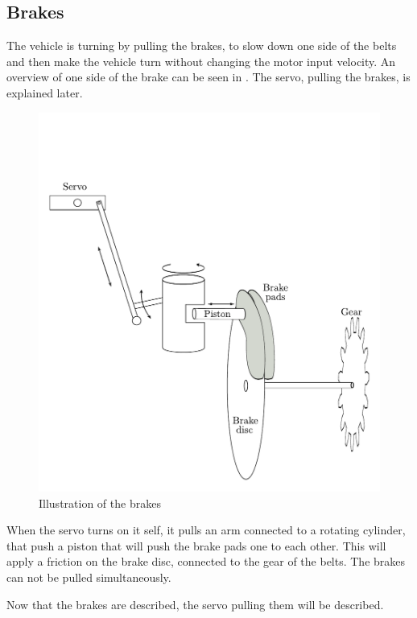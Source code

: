 \subsection{Brakes}

The vehicle is turning by pulling the brakes, to slow down one side of the belts and then make the vehicle turn without changing the motor input velocity. An overview of one side of the brake can be seen in . The servo, pulling the brakes, is explained later.

 \begin{figure}[H]
	\centering
	\includegraphics[scale=0.6]{figures/brakeDescription.pdf}
	\caption{Illustration of the brakes}
	\label{Brakes}
\end{figure}

When the servo turns on it self, it pulls an arm connected to a rotating cylinder, that push a piston that will push the brake pads one to each other. This will apply a friction on the brake disc, connected to the gear of the belts. The brakes can not be pulled simultaneously.

Now that the brakes are described, the servo pulling them will be described.